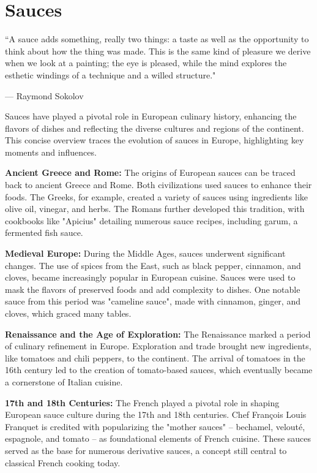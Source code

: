 \chapter{Sauces}
\epigraph{``A sauce adds something, really two things: a taste as well as the opportunity to think about how the thing was made. This is the same kind of pleasure we derive when we look at a painting; the eye is pleased, while the mind explores the esthetic windings of a technique and a willed structure."}{--- \textup{Raymond Sokolov}}

Sauces have played a pivotal role in European culinary history, enhancing the flavors of dishes and reflecting the diverse cultures and regions of the continent. This concise overview traces the evolution of sauces in Europe, highlighting key moments and influences.

\textbf{Ancient Greece and Rome:} The origins of European sauces can be traced back to ancient Greece and Rome. Both civilizations used sauces to enhance their foods. The Greeks, for example, created a variety of sauces using ingredients like olive oil, vinegar, and herbs. The Romans further developed this tradition, with cookbooks like "Apicius" detailing numerous sauce recipes, including garum, a fermented fish sauce.

\textbf{Medieval Europe:} During the Middle Ages, sauces underwent significant changes. The use of spices from the East, such as black pepper, cinnamon, and cloves, became increasingly popular in European cuisine. Sauces were used to mask the flavors of preserved foods and add complexity to dishes. One notable sauce from this period was "cameline sauce", made with cinnamon, ginger, and cloves, which graced many tables.

\textbf{Renaissance and the Age of Exploration:} The Renaissance marked a period of culinary refinement in Europe. Exploration and trade brought new ingredients, like tomatoes and chili peppers, to the continent. The arrival of tomatoes in the 16th century led to the creation of tomato-based sauces, which eventually became a cornerstone of Italian cuisine.

\textbf{17th and 18th Centuries:} The French played a pivotal role in shaping European sauce culture during the 17th and 18th centuries. Chef François Louis Franquet is credited with popularizing the "mother sauces" – bechamel, velouté, espagnole, and tomato – as foundational elements of French cuisine. These sauces served as the base for numerous derivative sauces, a concept still central to classical French cooking today.

